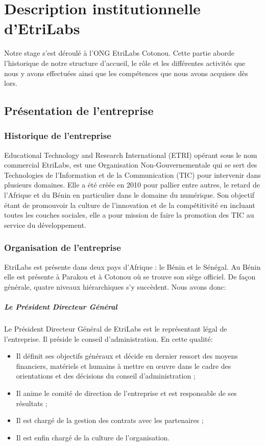 \chapter{Description institutionnelle d’EtriLabs}
Notre stage s’est déroulé à l’ONG EtriLabs Cotonou. Cette partie aborde l’historique de notre structure d’accueil, le rôle et les différentes activités que nous y avons effectuées ainsi que les compétences que nous avons acquises dès lors.

\section{Présentation de l'entreprise}

\subsection{Historique de l’entreprise}
Educational Technology and Research International (ETRI) opérant sous le nom commercial EtriLabs, est une Organisation Non-Gouvernementale qui se sert des Technologies de l’Information et de la Communication (TIC) pour intervenir dans plusieurs domaines. Elle a été créée en 2010 pour pallier entre autres, le retard de l’Afrique et du Bénin en particulier dans le domaine du numérique. Son objectif étant de promouvoir la culture de l’innovation et de la compétitivité en incluant toutes les couches sociales, elle a pour mission de faire la promotion des TIC au service du développement.

\subsection{Organisation de l’entreprise}
EtriLabs est présente dans deux pays d’Afrique : le Bénin et le Sénégal. Au Bénin elle est présente à Parakou et à Cotonou où se trouve son siège officiel. De façon générale, quatre niveaux hiérarchiques s’y succèdent. Nous avons donc:

\paragraph{Le Président Directeur Général}
$ $\\Le Président Directeur Général de EtriLabs est le représentant légal de l’entreprise. Il préside le conseil d’administration. En cette qualité:
\begin{itemize}
\item[\textbullet] Il définit ses objectifs généraux et décide en dernier ressort des moyens financiers, matériels et humains à mettre en œuvre dans le cadre des orientations et des décisions du conseil d’administration ;
\item[\textbullet] Il anime le comité de direction de l’entreprise et est responsable de ses résultats ;
\item[\textbullet] Il est chargé de la gestion des contrats avec les partenaires ;
\item[\textbullet] Il est enfin chargé de la culture de l’organisation.
\end{itemize}

